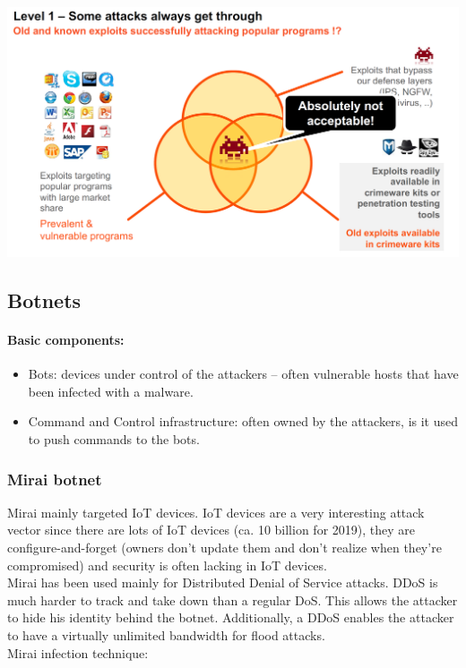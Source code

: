 \begin{minipage}{\linewidth}
    \centering      
    \includegraphics[width=\linewidth]{Figures/IDS_attack_model.PNG} 
\end{minipage}

\subsection{Botnets}

\paragraph{Basic components:}

\begin{itemize}
	\item Bots: devices under control of the attackers – often vulnerable hosts that have been
	infected with a malware.
	\item Command and Control infrastructure: often owned by the attackers, is it used to push
	commands to the bots.
\end{itemize}

\subsubsection{Mirai botnet}
\label{mirai_botnet}

Mirai mainly targeted IoT devices. IoT devices are a very interesting attack vector since there are lots of IoT devices (ca. 10 billion for 2019), they are configure-and-forget (owners don't update them and don't realize when they're compromised) and security is often lacking in IoT devices.\\
Mirai has been used mainly for Distributed Denial of Service attacks. DDoS is much harder to track and take down than a regular DoS. This allows the attacker to hide his identity behind the botnet. Additionally, a DDoS enables the attacker to have a virtually unlimited bandwidth for flood attacks.\\
Mirai infection technique:


